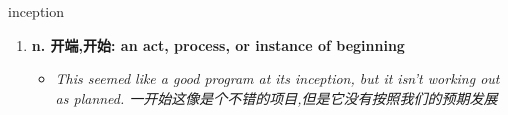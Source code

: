 
\begin{frame}
{\huge inception}
\begin{center}
\begin{enumerate}\Large
  \item \textbf{n. 开端,开始: an act, process, or instance of beginning}
  \begin{itemize}
    \item \em{\Large{This seemed like a good program at its inception, but it isn't working out as planned. 一开始这像是个不错的项目,但是它没有按照我们的预期发展}}
  \end{itemize}
\end{enumerate}
\end{center}
\end{frame}
